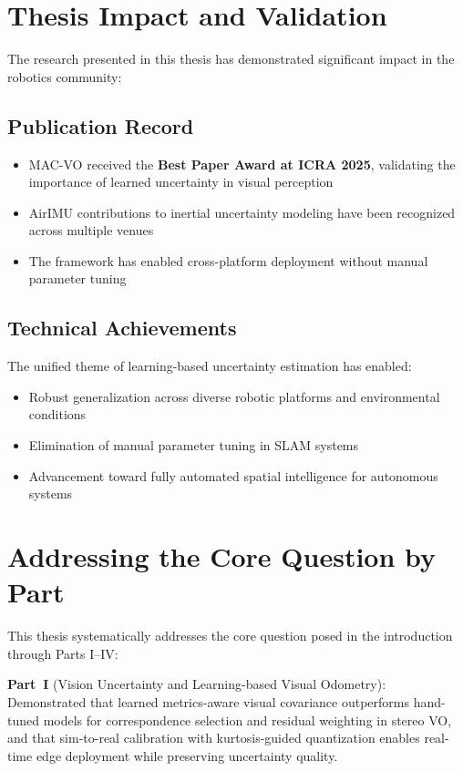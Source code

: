 \section{Thesis Impact and Validation}

The research presented in this thesis has demonstrated significant impact in the robotics community:

\subsection{Publication Record}
\begin{itemize}
    \item MAC-VO received the \textbf{Best Paper Award at ICRA 2025}, validating the importance of learned uncertainty in visual perception
    \item AirIMU contributions to inertial uncertainty modeling have been recognized across multiple venues
    \item The framework has enabled cross-platform deployment without manual parameter tuning
\end{itemize}

\subsection{Technical Achievements}
The unified theme of learning-based uncertainty estimation has enabled:
\begin{itemize}
    \item Robust generalization across diverse robotic platforms and environmental conditions
    \item Elimination of manual parameter tuning in SLAM systems
    \item Advancement toward fully automated spatial intelligence for autonomous systems
\end{itemize}

\section{Addressing the Core Question by Part}

This thesis systematically addresses the core question posed in the introduction through Parts I--IV:

\textbf{Part~I} (Vision Uncertainty and Learning-based Visual Odometry): Demonstrated that learned metrics-aware visual covariance outperforms hand-tuned models for correspondence selection and residual weighting in stereo VO, and that sim-to-real calibration with kurtosis-guided quantization enables real-time edge deployment while preserving uncertainty quality.


